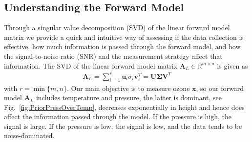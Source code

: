\subsection{Understanding the Forward Model}
\label{sec:SVD}
Through a singular value decomposition (SVD) of the linear forward model matrix we provide a quick and intuitive way of assessing if the data collection is effective, how much information is passed through the forward model, and how the signal-to-noise ratio (SNR) and the measurement strategy affect that information.
The SVD of the linear forward model matrix $\bm{A}_L \in \mathbb{R}^{m \times n}$ is given as
\begin{align}
	\bm{A}_L = \sum_{i =1}^{r} \bm{u}_i  \sigma_i \bm{v}^T_i = \bm{U} \bm{\Sigma} \bm{V}^T
\end{align}
with $r = \min\{m,n\}$.
Our main objective is to measure ozone $\bm{x}$, so our forward model $\bm{A}_L$ includes temperature and pressure, the latter is dominant, see Fig.~\ref{fig:PriorPressOverTemp}, decreases exponentially in height and hence does affect the information passed through the model.
If the pressure is high, the signal is large.
If the pressure is low, the signal is low, and the data tends to be noise-dominated.


